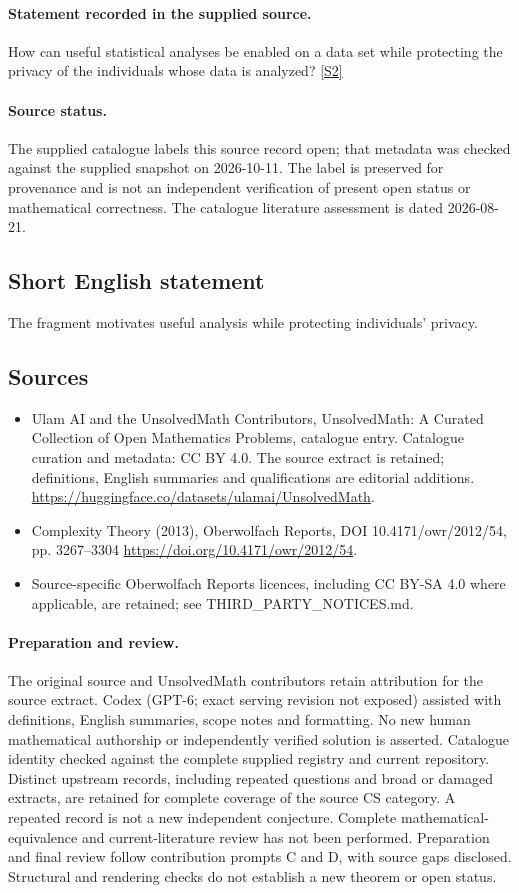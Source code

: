 \documentclass[11pt]{article}
\begin{document}
\paragraph{Statement recorded in the supplied source.}
How can useful statistical analyses be enabled on a data set while protecting the privacy of the individuals whose data is analyzed? \href{https://doi.org/10.4171/owr/2012/54}{[S2]}
\paragraph{Source status.}
The supplied catalogue labels this source record open; that metadata was checked against the supplied snapshot on 2026-10-11. The label is preserved for provenance and is not an independent verification of present open status or mathematical correctness. The catalogue literature assessment is dated 2026-08-21.
\subsection{Short English statement}
The fragment motivates useful analysis while protecting individuals' privacy.
\subsection{Sources}
\begin{itemize}
\item[S1] Ulam AI and the UnsolvedMath Contributors, UnsolvedMath: A Curated Collection of Open Mathematics Problems, catalogue entry. Catalogue curation and metadata: CC BY 4.0. The source extract is retained; definitions, English summaries and qualifications are editorial additions.
\url{https://huggingface.co/datasets/ulamai/UnsolvedMath}.
\item[S2] Complexity Theory (2013), Oberwolfach Reports, DOI 10.4171/owr/2012/54, pp. 3267--3304
\url{https://doi.org/10.4171/owr/2012/54}.
\item Source-specific Oberwolfach Reports licences, including CC BY-SA 4.0 where applicable, are retained; see THIRD\_PARTY\_NOTICES.md.
\end{itemize}
\paragraph{Preparation and review.}
The original source and UnsolvedMath contributors retain attribution for the source extract. Codex (GPT-6; exact serving revision not exposed) assisted with definitions, English summaries, scope notes and formatting. No new human mathematical authorship or independently verified solution is asserted. Catalogue identity checked against the complete supplied registry and current repository. Distinct upstream records, including repeated questions and broad or damaged extracts, are retained for complete coverage of the source CS category. A repeated record is not a new independent conjecture. Complete mathematical-equivalence and current-literature review has not been performed. Preparation and final review follow contribution prompts C and D, with source gaps disclosed. Structural and rendering checks do not establish a new theorem or open status.
\label{end:statement}
\end{document}
